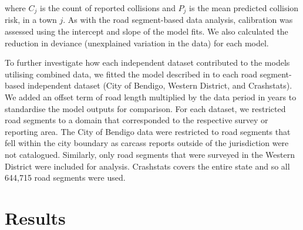 \noindent where $C_j$ is the count of reported collisions and $P_j$ is the mean predicted collision risk, in a town $j$. As with the road segment-based data analysis, calibration was assessed using the intercept and slope of the model fits. We also calculated the reduction in deviance (unexplained variation in the data) for each model.

To further investigate how each independent dataset contributed to the models utilising combined data, we fitted the model described in  to each road segment-based independent dataset (City of Bendigo, Western District, and Crashstats). We added an offset term of road length multiplied by the data period in years to standardise the model outputs for comparison. For each dataset, we restricted road segments to a domain that corresponded to the respective survey or reporting area. The City of Bendigo data were restricted to road segments that fell within the city boundary as carcass reports outside of the jurisdiction were not catalogued. Similarly, only road segments that were surveyed in the Western District were included for analysis. Crashstats covers the entire state and so all 644,715 road segments were used. 

\section{Results}

